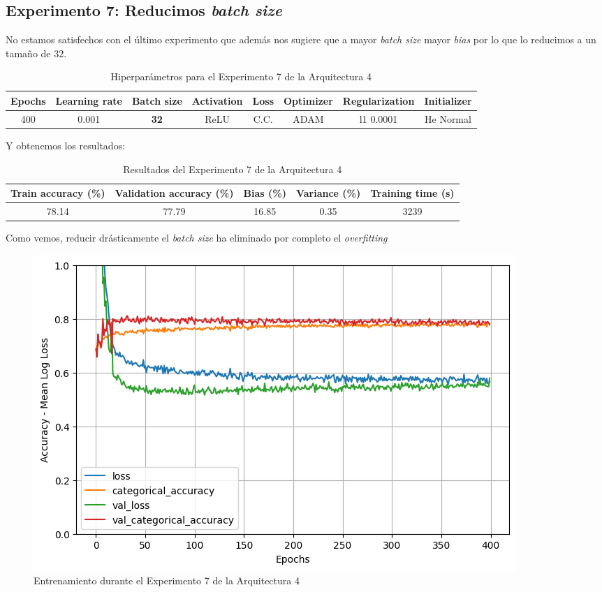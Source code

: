 \documentclass{article}
\begin{document}
        \subsection{Experimento 7: Reducimos \textit{batch size}}
        \label{d-s-a4-e7}
			No estamos satisfechos con el \'ultimo experimento que adem\'as nos sugiere que a mayor \textit{batch size} mayor \textit{bias} por lo que lo reducimos a un tama\~no de 32.
			
			\begin{table}[!h]
				\begin{tabular}{|c|c|c|c|c|c|c|c|}
					\textbf{Epochs}&\textbf{Learning rate}&\textbf{Batch size}&\textbf{Activation}&\textbf{Loss}&\textbf{Optimizer}&\textbf{Regularization}  & \textbf{Initializer} \\ \hline
					400 & 0.001 & \textbf{32} & ReLU & C.C. & ADAM & l1 0.0001 & He Normal
				\end{tabular}
				\caption{Hiperpar\'ametros para el Experimento 7 de la Arquitectura 4}
				\label{tab:hip-d-a4-e7}
			\end{table}
			Y obtenemos los resultados:
			\begin{table}[!h]
				\begin{center}
					\begin{tabular}{| c | c | c | c | c |}
						\textbf{Train accuracy (\%)} & \textbf{Validation accuracy (\%)} & \textbf{Bias (\%)} & \textbf{Variance (\%)} & \textbf{Training time (s)} \\ \hline
						78.14 & 77.79 & 16.85 & 0.35 & 3239 \\ \hline
					\end{tabular}
					\caption{Resultados del Experimento 7 de la Arquitectura 4}
					\label{tab:res-d-a4-e7}
				\end{center}
			\end{table}
   
			Como vemos, reducir dr\'asticamente el \textit{batch size} ha eliminado por completo el \textit{overfitting}
			\begin{figure}[!h]
				\begin{center}
					\includegraphics[scale=0.5]{d-tr-a4-e7.png}		
					\caption{Entrenamiento durante el Experimento 7 de la Arquitectura 4}	
					\label{d-tr-a4-e7}
				\end{center}
			\end{figure}
\end{document}
